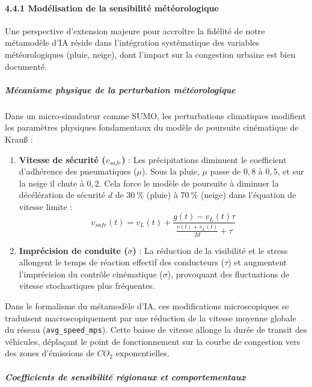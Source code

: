 \documentclass[10pt, a4paper]{article}
\providecommand{\tightlist}{}
\begin{document}
\paragraph{4.4.1 Modélisation de la sensibilité
météorologique}\label{moduxe9lisation-de-la-sensibilituxe9-muxe9tuxe9orologique}

Une perspective d'extension majeure pour accroître la fidélité de notre
métamodèle d'IA réside dans l'intégration systématique des variables
météorologiques (pluie, neige), dont l'impact sur la congestion urbaine
est bien documenté.

\subparagraph{Mécanisme physique de la perturbation
météorologique}\label{muxe9canisme-physique-de-la-perturbation-muxe9tuxe9orologique}

Dans un micro-simulateur comme SUMO, les perturbations climatiques
modifient les paramètres physiques fondamentaux du modèle de poursuite
cinématique de Krauß :

\begin{enumerate}
\def\labelenumi{\arabic{enumi}.}
\tightlist
\item
  \textbf{Vitesse de sécurité (\(v_{safe}\))} : Les précipitations
  diminuent le coefficient d'adhérence des pneumatiques (\(\mu\)). Sous
  la pluie, \(\mu\) passe de \(0,8\) à \(0,5\), et sur la neige il chute
  à \(0,2\). Cela force le modèle de poursuite à diminuer la
  décélération de sécurité \(d\) de \(30\ \%\) (pluie) à \(70\ \%\)
  (neige) dans l'équation de vitesse limite :
  \[v_{safe}(t) = v_L(t) + \frac{g(t) - v_L(t)\tau}{\frac{v(t) + v_L(t)}{2d} + \tau}\]
\item
  \textbf{Imprécision de conduite (\(\sigma\))} : La réduction de la
  visibilité et le stress allongent le temps de réaction effectif des
  conducteurs (\(\tau\)) et augmentent l'imprécision du contrôle
  cinématique (\(\sigma\)), provoquant des fluctuations de vitesse
  stochastiques plus fréquentes.
\end{enumerate}

Dans le formalisme du métamodèle d'IA, ces modifications microscopiques
se traduisent macroscopiquement par une réduction de la vitesse moyenne
globale du réseau (\texttt{avg\_speed\_mps}). Cette baisse de vitesse
allonge la durée de transit des véhicules, déplaçant le point de
fonctionnement sur la courbe de congestion vers des zones d'émissions de
\(CO_2\) exponentielles.

\subparagraph{Coefficients de sensibilité régionaux et
comportementaux}\label{coefficients-de-sensibilituxe9-ruxe9gionaux-et-comportementaux}
\end{document}
